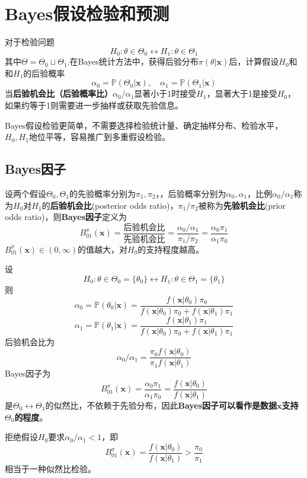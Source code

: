 \documentclass{ctexbook}
\begin{document}
\section{Bayes假设检验和预测}

对于检验问题
$$H_0:\theta\in\Theta_0\leftrightarrow H_1:\theta\in\Theta_1$$
其中$\Theta=\Theta_0\sqcup\Theta_1$.在Bayes统计方法中，获得后验分布$\pi(\theta|\mathbf{x})$后，计算假设$H_0$和和$H_1$的后验概率$$\alpha_0=\mathbb{P}(\Theta_0|\mathbf{x}),\quad\alpha_1=\mathbb{P}(\Theta_1|\mathbf{x})$$
当\textbf{后验机会比（后验概率比）}$\alpha_0/\alpha_1$显著小于1时接受$H_1$，显著大于1是接受$H_0$，如果约等于1则需要进一步抽样或获取先验信息。

Bayes假设检验更简单，不需要选择检验统计量、确定抽样分布、检验水平，$H_0,H_1$地位平等，容易推广到多重假设检验。

\subsection{Bayes因子}

\begin{definition}[Bayes因子]
    设两个假设$\Theta_0,\Theta_1$的先验概率分别为$\pi_1,\pi_2$，，后验概率分别为$\alpha_0,\alpha_1$，比例$\alpha_0/\alpha_1$称为$H_0$对$H_1$的\textbf{后验机会比}(posterior odds ratio)，$\pi_1/\pi_2$被称为\textbf{先验机会比}(prior odds ratio)，则\textbf{Bayes因子}定义为
    $$B_{01}^\pi(\mathbf{x})=\frac{\text{后验机会比}}{\text{先验机会比}}=\frac{\alpha_0/\alpha_1}{\pi_1/\pi_2}=\frac{\alpha_0\pi_1}{\alpha_1\pi_0}$$
    $B_{01}^\pi(\mathbf{x})\in(0,\infty)$的值越大，对$H_0$的支持程度越高。
\end{definition}

\begin{example}[简单假设情形]
    设
    $$H_0:\theta\in\Theta_0=\{\theta_0\}\leftrightarrow H_1:\theta\in\Theta_1=\{\theta_1\}$$
    则
    $$\alpha_0=\mathbb{P}(\theta_0|\mathbf{x})=\frac{f(\mathbf{x}|\theta_0)\pi_0}{f(\mathbf{x}|\theta_0)\pi_0+f(\mathbf{x}|\theta_1)\pi_1}$$
    $$\alpha_1=\mathbb{P}(\theta_1|\mathbf{x})=\frac{f(\mathbf{x}|\theta_1)\pi_1}{f(\mathbf{x}|\theta_0)\pi_0+f(\mathbf{x}|\theta_1)\pi_1}$$
    后验机会比为
    $$\alpha_0/\alpha_1=\frac{\pi_0 f(\mathbf{x}|\theta_0)}{\pi_1 f(\mathbf{x}|\theta_1)}$$
    Bayes因子为
    $$B_{01}^\pi(\mathbf{x})=\frac{\alpha_0\pi_1}{\alpha_1\pi_0}=\frac{f(\mathbf{x}|\theta_0)}{f(\mathbf{x}|\theta_1)}$$
    是$\Theta_0\leftrightarrow\Theta_1$的似然比，不依赖于先验分布，因此\textbf{Bayes因子可以看作是数据$\mathbf{x}$支持$\Theta_0$的程度}。
    
    拒绝假设$H_0$要求$\alpha_0/\alpha_1<1$，即
    $$B_{01}^\pi(\mathbf{x})=\frac{f(\mathbf{x}|\theta_0)}{f(\mathbf{x}|\theta_1)}>\frac{\pi_0}{\pi_1}$$
    相当于一种似然比检验。
\end{example}
\end{document}
